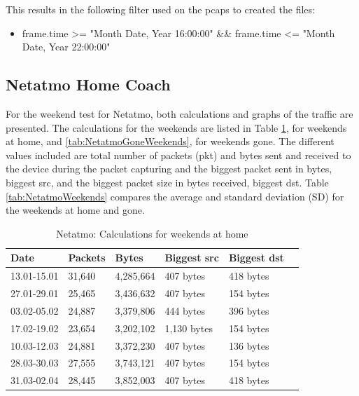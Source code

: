 This results in the following filter used on the pcaps to created the files: 

\begin{itemize}
    \item frame.time >= "Month Date, Year 16:00:00" \&\& frame.time <= "Month Date, Year 22:00:00"
\end{itemize}

\newpage
\subsection{Netatmo Home Coach}
For the weekend test for Netatmo, both calculations and graphs of the traffic are presented. The calculations for the weekends are listed in Table \ref{tab:NetatmoHomeWeekends}, for weekends at home, and \ref{tab:NetatmoGoneWeekends}, for weekends gone. The different values included are total number of packets (pkt) and bytes sent and received to the device during the packet capturing and the biggest packet sent in bytes, biggest src, and the biggest packet size in bytes received, biggest dst. Table \ref{tab:NetatmoWeekends} compares the average and standard deviation (SD) for the weekends at home and gone. 

\begin{table}[H]
    \centering
    \caption{Netatmo: Calculations for weekends at home}
    \begin{tabular}{|l|l|l|l|l|l|}
    \hline
        \textbf{Date} & \textbf{Packets} & \textbf{Bytes}  & \textbf{Biggest src} & \textbf{Biggest dst} \\ \hline
        13.01-15.01   & 31,640           & 4,285,664       & 407 bytes            & 418 bytes            \\ \hline
        27.01-29.01   & 25,465           & 3,436,632       & 407 bytes            & 154 bytes            \\ \hline
        03.02-05.02   & 24,887           & 3,379,806       & 444 bytes            & 396 bytes            \\ \hline
        17.02-19.02   & 23,654           & 3,202,102       & 1,130 bytes          & 154 bytes            \\ \hline
        10.03-12.03   & 24,881           & 3,372,230       & 407 bytes            & 136 bytes            \\ \hline
        28.03-30.03   & 27,555           & 3,743,121       & 407 bytes            & 154 bytes            \\ \hline
        31.03-02.04   & 28,445           & 3,852,003       & 407 bytes            & 418 bytes            \\ \hline
    \end{tabular}
    \label{tab:NetatmoHomeWeekends}
\end{table}

